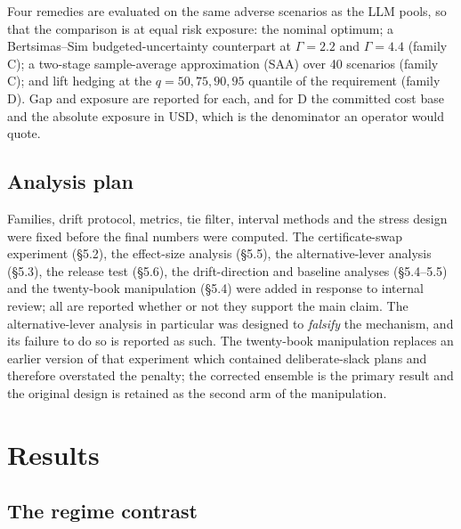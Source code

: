\documentclass[preprint,12pt,letterpaper]{elsarticle}
\theoremstyle{definition}
\theoremstyle{plain}
\begin{document}
Four remedies are evaluated on the same adverse scenarios as the LLM pools, so that the comparison is at equal risk exposure: the nominal optimum; a Bertsimas--Sim budgeted-uncertainty counterpart at $\Gamma = 2.2$ and $\Gamma = 4.4$ (family C); a two-stage sample-average approximation (SAA) over 40 scenarios (family C); and lift hedging at the $q = 50, 75, 90, 95$ quantile of the requirement (family D). Gap and exposure are reported for each, and for D the committed cost base and the absolute exposure in USD, which is the denominator an operator would quote.

\subsection{Analysis plan}

Families, drift protocol, metrics, tie filter, interval methods and the stress design were fixed before the final numbers were computed. The certificate-swap experiment (\S 5.2), the effect-size analysis (\S 5.5), the alternative-lever analysis (\S 5.3), the release test (\S 5.6), the drift-direction and baseline analyses (\S 5.4--5.5) and the twenty-book manipulation (\S 5.4) were added in response to internal review; all are reported whether or not they support the main claim. The alternative-lever analysis in particular was designed to \textit{falsify} the mechanism, and its failure to do so is reported as such. The twenty-book manipulation replaces an earlier version of that experiment which contained deliberate-slack plans and therefore overstated the penalty; the corrected ensemble is the primary result and the original design is retained as the second arm of the manipulation.

\section{Results}

\subsection{The regime contrast}
\end{document}
